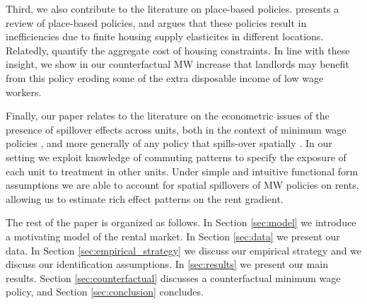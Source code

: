 Third, we also contribute to the literature on place-based policies.
\parencite{KlineMoretti2014} presents a review of place-based policies, and argues
that these policies result in inefficiencies due to finite housing supply 
elasticites in different locations.
Relatedly, \textcite{HsiehMoretti2019} quantify the aggregate cost of housing 
constraints.
In line with these insight, we show in our counterfactual MW increase that 
landlords may benefit from this policy eroding some of the extra disposable 
income of low wage workers. 



Finally, our paper relates to the literature on the econometric issues of the 
presence of spillover effects across units,
both in the context of minimum wage policies \parencite{Kuehn2016, Huang2020}, and
more generally of any policy that spills-over spatially
\parencite{DelgadoFlorax2015, Butts2021}. 
In our setting we exploit knowledge of commuting patterns to specify the exposure
of each unit to treatment in other units.
Under simple and intuitive functional form assumptions we are able to account for 
spatial spillovers of MW policies on rents, allowing us
to estimate rich effect patterns on the rent gradient. 

The rest of the paper is organized as follows.
In Section \ref{sec:model} we introduce a motivating model of the rental market.
In Section \ref{sec:data} we present our data.
In Section \ref{sec:empirical_strategy} we discuss our empirical strategy and
we discuss our identification assumptions.
In \ref{sec:results} we present our main results.
Section \ref{sec:counterfactual} discusses a counterfactual minimum wage policy, and
Section \ref{sec:conclusion} concludes.
